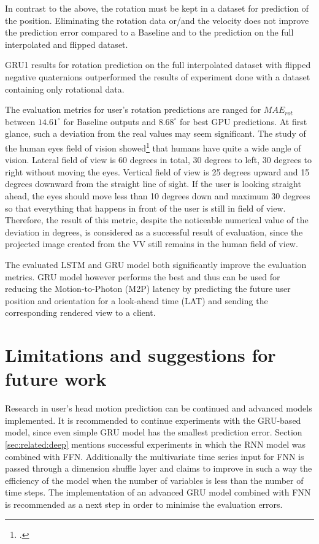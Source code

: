 In contrast to the above, the rotation must be kept in a dataset for prediction of the position. Eliminating the rotation data or/and the velocity does not improve the prediction error compared to a Baseline and to the prediction on the full interpolated and flipped dataset.

GRU1 results for rotation prediction on the full interpolated dataset with flipped negative quaternions outperformed the results of experiment done with a dataset containing only rotational data. 

The evaluation metrics for user's rotation predictions are ranged for $MAE_{rot}$ between $14.61^{\circ}$ for Baseline outputs and $8.68^{\circ}$ for best GPU predictions. At first glance, such a deviation from the real values may seem significant. The study of the human eyes field of vision showed\footcite{https://medium.com/@catalin.macovei/positioning-of-infotainment-screen-in-cars-e4cffa1e5697}  that humans have quite a wide angle of vision. Lateral field of view is 60 degrees in total, 30 degrees to left, 30 degrees to right without moving the eyes. Vertical field of view is 25 degrees upward and 15 degrees downward from the straight line of sight. If the user is looking straight ahead, the eyes should move less than 10 degrees down and maximum 30 degrees so that everything that happens in front of the user is still in field of view. Therefore, the result of this metric, despite the noticeable numerical value of the deviation in degrees, is considered as a successful result of evaluation, since the projected image created from the VV still remains in the human field of view.

The evaluated LSTM and GRU model both significantly improve the evaluation metrics. GRU model however performs the best and thus can be used for reducing the Motion-to-Photon (M2P) latency by predicting the future user position and orientation for a look-ahead time (LAT) and sending the corresponding rendered view to a client.

\section{Limitations and suggestions for future work}
\label{sec:conclusion:future}
Research in user's head motion prediction can be continued and advanced models implemented. It is recommended to continue experiments with the GRU-based model, since even simple GRU model has the smallest prediction error. Section \ref{sec:related:deep} mentions successful experiments in which the RNN model was combined with FFN. Additionally the multivariate time series input for FNN is passed through a dimension shuffle layer and \cite{lstm_fcn} claims to improve in such a way the efficiency of the model when the number of variables is less than the number of time steps. The implementation of an advanced GRU model combined with FNN is recommended as a next step in order to minimise the evaluation errors. 

